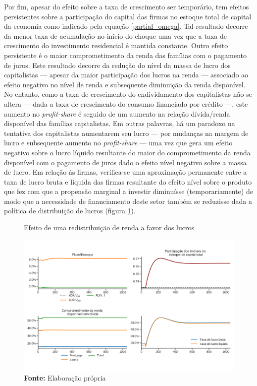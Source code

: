 Por fim, apesar do efeito sobre a taxa de crescimento ser temporário, tem efeitos persistentes sobre a participação do capital das firmas no estoque total de capital da economia como indicado pela equação \ref{partial_omega}. Tal resultado decorre da menor taxa de acumulação no início do choque uma vez que a taxa de crescimento do investimento residencial é mantida constante. 
Outro efeito persistente é o maior comprometimento da renda das famílias com o pagamento de juros. 
Este resultado decorre da redução do nível da massa de lucro dos capitalistas  --- apesar da maior participação dos lucros na renda --- associado ao efeito negativo no nível de renda e subsequente diminuição da renda disponível.
No entanto, como a taxa de crescimento do endividamento dos capitalistas não se altera --- dada a taxa de crescimento do consumo financiado por crédito ---, este aumento no \textit{profit-share} é seguido de um aumento na relação dívida/renda disponível das famílias capitalistas.
Em outras palavras, há um paradoxo na tentativa dos capitalistas aumentarem seu lucro --- por mudanças na margem de lucro e subsequente aumento no \textit{profit-share} --- uma vez que gera um efeito negativo sobre o lucro líquido resultante do maior do comprometimento da renda disponível com o pagamento de juros dado o efeito nível negativo sobre a massa de lucro.
Em relação às firmas, verifica-se uma aproximação permanente entre a taxa de lucro bruta e líquida das firmas resultante do efeito nível sobre o produto que fez com que a propensão marginal a investir diminuísse (temporariamente) de modo que a necessidade de financiamento deste setor também se reduzisse dada a política de distribuição de lucros (figura \ref{choque_2Norms}).

\begin{figure}[H]
	\centering
	\caption{Efeito de uma redistribuição de renda a favor dos lucros}
	\label{choque_2Norms}
	\includegraphics[width=\textwidth]{../../Modelo/Versoes/Shock_2Norms.png}
	\caption*{\textbf{Fonte:} Elaboração própria}
\end{figure}


